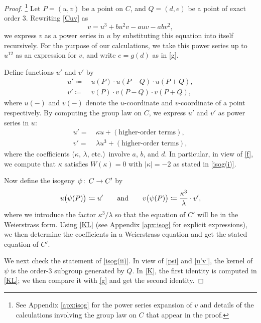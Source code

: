 \documentclass{gtpart}
\theoremstyle{definition}
\theoremstyle{remark}
\def\co{\colon\thinspace}
\newcommand{\ad}{{\rm and}}
\newcommand{\K}{\kappa}
\begin{document}
\begin{proof}
 \footnote{See Appendix \ref{apx:isog} for the power series expansion of 
 $v$ and details of the calculations involving the group law on $C$ that 
 appear in the proof.  }
 Let $P = (u,v)$ be a point on $C$, and $Q = (d,e)$ be a point of exact 
 order 3.  Rewriting \eqref{Cuv} as 
 \[
  v = u^3 + b u^2 v - a u v - a b v^2, 
 \]
 we express $v$ as a power series in $u$ by substituting this equation 
 into itself recursively.  For the purpose of our calculations, we take 
 this power series up to $u^{12}$ as an expression for $v$, and write 
 $e = g(d)$ as in \eqref{g}.  

 Define functions $u'$ and $v'$ by 
 \begin{equation}
 \label{u'v'}
 \begin{split}
  u' \coloneqq & ~ u(P) \cdot u(P-Q) \cdot u(P+Q), \\
  v' \coloneqq & ~ v(P) \cdot v(P-Q) \cdot v(P+Q), 
 \end{split}
 \end{equation}
 where $u(-)$ and $v(-)$ denote the $u$-coordinate and $v$-coordinate of 
 a point respectively.  By computing the group law on $C$, we express 
 $u'$ and $v'$ as power series in $u$: 
 \begin{equation}
 \label{KL}
 \begin{split}
  u' = & ~ \K u + (\text{higher-order terms}), \\
  v' = & ~ \lambda u^3 + (\text{higher-order terms}), 
 \end{split}
 \end{equation}
 where the coefficients ($\K$, $\lambda$, etc.)~involve $a$, $b$, and 
 $d$.  In particular, in view of \eqref{f}, we compute that $\K$ 
 satisfies $W(\K) = 0$ with $|\K| = -2$ as stated in \eqref{isog(i)}.  

 Now define the isogeny $\psi \co C \to C'$ by 
 \begin{equation}
 \label{psi}
  u\big( \psi(P) \big) \coloneqq u' \qquad \ad \qquad v\big( \psi(P) \big) \coloneqq \frac{\K^3}{\lambda} \cdot v', 
 \end{equation}
 where we introduce the factor $\K^3 / \lambda$ so that the equation of 
 $C'$ will be in the Weierstrass form.  Using \eqref{KL} (see Appendix 
 \ref{apx:isog} for explicit expressions), we then determine the 
 coefficients in a Weierstrass equation and get the stated equation of 
 $C'$.  

 We next check the statement of \eqref{isog(ii)}.  In view of 
 \eqref{psi} and \eqref{u'v'}, the kernel of $\psi$ is the order-3 
 subgroup generated by $Q$.  In \eqref{K}, the first identity is 
 computed in \eqref{KL}; we then compare it with \eqref{g} and get the 
 second identity.  


\end{proof}
\end{document}
